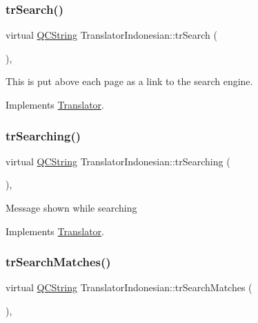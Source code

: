 \subsubsection{\texorpdfstring{trSearch()}{trSearch()}}
{\footnotesize\ttfamily virtual \mbox{\hyperlink{class_q_c_string}{Q\+C\+String}} Translator\+Indonesian\+::tr\+Search (\begin{DoxyParamCaption}{ }\end{DoxyParamCaption})\hspace{0.3cm}{\ttfamily [inline]}, {\ttfamily [virtual]}}

This is put above each page as a link to the search engine. 

Implements \mbox{\hyperlink{class_translator}{Translator}}.

\mbox{\label{class_translator_indonesian_a3158ca0a6ae8c1d65e5fe214d17e2a60}} 
\subsubsection{\texorpdfstring{trSearching()}{trSearching()}}
{\footnotesize\ttfamily virtual \mbox{\hyperlink{class_q_c_string}{Q\+C\+String}} Translator\+Indonesian\+::tr\+Searching (\begin{DoxyParamCaption}{ }\end{DoxyParamCaption})\hspace{0.3cm}{\ttfamily [inline]}, {\ttfamily [virtual]}}

Message shown while searching 

Implements \mbox{\hyperlink{class_translator}{Translator}}.

\mbox{\label{class_translator_indonesian_af595203553ea2b4ad1fa441e693d5bba}} 
\subsubsection{\texorpdfstring{trSearchMatches()}{trSearchMatches()}}
{\footnotesize\ttfamily virtual \mbox{\hyperlink{class_q_c_string}{Q\+C\+String}} Translator\+Indonesian\+::tr\+Search\+Matches (\begin{DoxyParamCaption}{ }\end{DoxyParamCaption})\hspace{0.3cm}{\ttfamily [inline]}, {\ttfamily [virtual]}}

